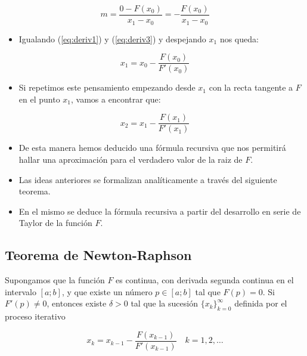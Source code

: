 \documentclass[openany]{book}
\providecommand{\tightlist}{%
  \setlength{\itemsep}{0pt}\setlength{\parskip}{0pt}}
\begin{document}
\begin{equation}
\label{eq:deriv3}
m = \frac{0 - F(x_0)}{x_1 - x_0} = - \frac{F(x_0)}{x_1 - x_0}
\end{equation}

\begin{itemize}
\tightlist
\item
  Igualando (\ref{eq:deriv1}) y (\ref{eq:deriv3}) y despejando \(x_1\) nos queda:
\end{itemize}

\begin{equation}
\label{eq:deriv4}
x_1 = x_0 - \frac{F(x_0)}{F'(x_0)}
\end{equation}

\begin{itemize}
\tightlist
\item
  Si repetimos este pensamiento empezando desde \(x_1\) con la recta tangente a \(F\) en el punto \(x_1\), vamos a encontrar que:
\end{itemize}

\begin{equation}
\label{eq:deriv5}
x_2 = x_1 - \frac{F(x_1)}{F'(x_1)}
\end{equation}

\begin{itemize}
\item
  De esta manera hemos deducido una fórmula recursiva que nos permitirá hallar una aproximación para el verdadero valor de la raiz de \(F\).
\item
  Las ideas anteriores se formalizan analíticamente a través del siguiente teorema.
\item
  En el mismo se deduce la fórmula recursiva a partir del desarrollo en serie de Taylor de la función \(F\).
\end{itemize}

\hypertarget{teorema-de-newton-raphson}{%
\subsection{Teorema de Newton-Raphson}\label{teorema-de-newton-raphson}}

Supongamos que la función \(F\) es continua, con derivada segunda continua en el intervalo \([a; b]\), y que existe un número \(p \in [a; b]\) tal que \(F(p) = 0\). Si \(F'(p) \neq 0\), entonces existe \(\delta > 0\) tal que la sucesión \(\{x_k\}_{k=0}^{\infty}\) definida por el proceso iterativo

\[
x_k = x_{k-1} - \frac{F(x_{k-1})}{F'(x_{k-1})} \quad k = 1, 2, \dots
\]
\end{document}
